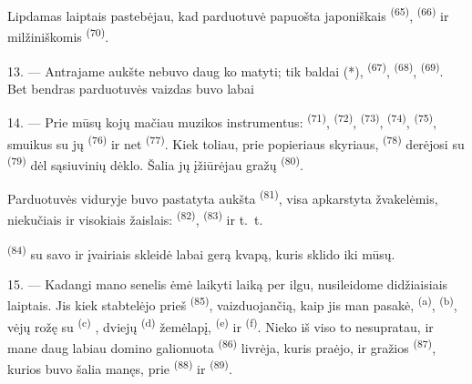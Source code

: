 Lipdamas laiptais pastebėjau, kad parduotuvė papuošta japoniškais
 \textsuperscript{(65)},  \textsuperscript{(66)} ir
milžiniškomis  \textsuperscript{(70)}.

13. --- Antrajame aukšte nebuvo daug ko matyti; tik baldai (*), 
\textsuperscript{(67)},  \textsuperscript{(68)},  \textsuperscript{(69)}. Bet bendras parduotuvės vaizdas buvo labai

14. --- Prie mūsų kojų mačiau muzikos instrumentus: 
\textsuperscript{(71)},  \textsuperscript{(72)}, 
\textsuperscript{(73)},  \textsuperscript{(74)},
 \textsuperscript{(75)}, smuikus su jų 
\textsuperscript{(76)} ir net  \textsuperscript{(77)}. Kiek
toliau, prie popieriaus skyriaus,  \textsuperscript{(78)} derėjosi su
 \textsuperscript{(79)} dėl sąsiuvinių dėklo. Šalia jų įžiūrėjau
gražų  \textsuperscript{(80)}.

Parduotuvės viduryje buvo pastatyta aukšta 
\textsuperscript{(81)}, visa apkarstyta žvakelėmis, niekučiais ir visokiais žaislais:
 \textsuperscript{(82)}, 
\textsuperscript{(83)} ir t.~t.

 \textsuperscript{(84)} su savo  ir
įvairiais  skleidė labai gerą kvapą, kuris sklido iki mūsų.

\VUsaut{3.4mm}
\VUsaut{2.8mm}

15. --- Kadangi mano senelis ėmė laikyti laiką per ilgu, nusileidome didžiaisiais
laiptais. Jis kiek stabtelėjo prieš 
\textsuperscript{(85)}, vaizduojančią, kaip jis man pasakė, 
\textsuperscript{(a)},  \textsuperscript{(b)},
vėjų rožę su  \textsuperscript{(c)}
, dviejų 
\textsuperscript{(d)} žemėlapį,  \textsuperscript{(e)} ir
 \textsuperscript{(f)}. Nieko iš viso to nesupratau, ir mane
daug labiau domino galionuota  \textsuperscript{(86)} livrėja,
kuris praėjo, ir gražios  \textsuperscript{(87)}, kurios buvo šalia
manęs, prie  \textsuperscript{(88)} ir 
\textsuperscript{(89)}.


